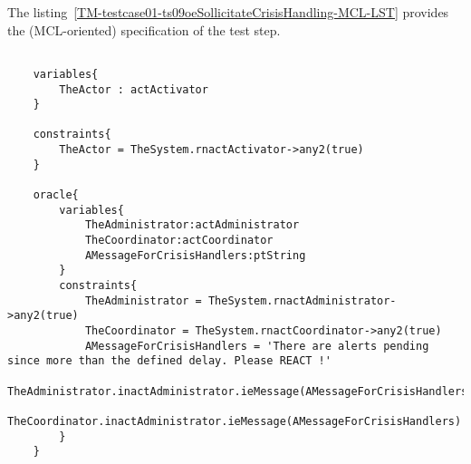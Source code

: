 	
	
		
	\vspace{1cm}
	The listing~\ref{TM-testcase01-ts09oeSollicitateCrisisHandling-MCL-LST} provides the \msrmessir (MCL-oriented) specification of the test step.
	
	\scriptsize
	\vspace{0.5cm}
	\begin{lstlisting}[style=MessirStyle,firstnumber=auto,captionpos=b,caption={\msrmessir (MCL-oriented) specification of the test step \emph{testcase01-ts09oeSollicitateCrisisHandling}.},label=TM-testcase01-ts09oeSollicitateCrisisHandling-MCL-LST]

	variables{
		TheActor : actActivator
	}
	
	constraints{
		TheActor = TheSystem.rnactActivator->any2(true)
	}
	
	oracle{
		variables{
			TheAdministrator:actAdministrator
			TheCoordinator:actCoordinator
			AMessageForCrisisHandlers:ptString
		}
		constraints{
			TheAdministrator = TheSystem.rnactAdministrator->any2(true)
			TheCoordinator = TheSystem.rnactCoordinator->any2(true)
			AMessageForCrisisHandlers = 'There are alerts pending since more than the defined delay. Please REACT !'
			TheAdministrator.inactAdministrator.ieMessage(AMessageForCrisisHandlers)
			TheCoordinator.inactAdministrator.ieMessage(AMessageForCrisisHandlers)
		}
	}
	
	\end{lstlisting}
	\normalsize 
	
	
